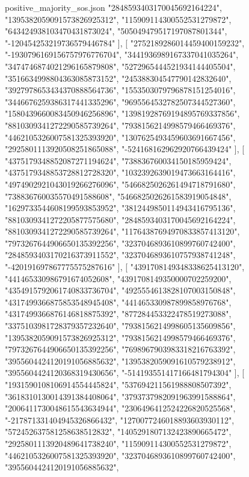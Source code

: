 \begin{filecontents*}[overwrite]{positive_majority_sos.json}
    "2848593403170045692164224",
    "1395382059091573826925312",
    "115909114300552531279872",
    "643424938103470431873024",
    "505049479517197087801344",
    "-120454253219736579446784"
   ],
   [
    "2752189286014459400159232",
    "-1930796169156757976776704",
    "3441936989167337041035264",
    "3474746874021296165879808",
    "5272965444521934144405504",
    "3516634998804363085873152",
    "245388304547790142832640",
    "3927978653434370888564736",
    "1553503079796878151254016",
    "3446676259386317441335296",
    "9695564532782507344527360",
    "1580439660083450946256896",
    "13981928769194895769337856",
    "8810309341272290585739264",
    "7938156214998579466469376",
    "4462105326007581325393920",
    "1307625493459603691667456",
    "2925801113920508251865088",
    "-524168162962920766439424"
   ],
   [
    "4375179348852087271194624",
    "738836760034150185959424",
    "4375179348853728812728320",
    "1032392639019473663164416",
    "4974902921043019266276096",
    "5466825026261494718791680",
    "738836760035570491588608",
    "5466825026261583919054848",
    "1629733544608199593853952",
    "3812449850114943416795136",
    "8810309341272205877575680",
    "2848593403170045692164224",
    "8810309341272290585739264",
    "11764387694970833857413120",
    "7973267644906650135392256",
    "3237046893610899760742400",
    "2848593403170216373911552",
    "3237046893610757938741248",
    "-420191697867775575287616"
   ],
   [
    "4391708149348338625413120",
    "441465330986791674052608",
    "4391708149350000702259200",
    "4354915792061740833736704",
    "4925554613828107003150848",
    "4317499366875853548945408",
    "441465330987899858976768",
    "4317499366876146818875392",
    "877284453322478519273088",
    "3375103981728379357232640",
    "7938156214998605135609856",
    "1395382059091573826925312",
    "7938156214998579466469376",
    "7973267644906650135392256",
    "7698967903983318216763392",
    "3955604424120191056885632",
    "1395382059091610579238912",
    "3955604424120368319430656",
    "-514193551417166481794304"
   ],
   [
    "1931590108106914554445824",
    "537694211561988808507392",
    "3618310130014391384408064",
    "3793737982091963991588864",
    "2006411730048615543634944",
    "2306496412524226820525568",
    "-217871331404945326866432",
    "1270077246018893603930112",
    "572452637581258638512832",
    "1405291807132423890665472",
    "2925801113920489641738240",
    "115909114300552531279872",
    "4462105326007581325393920",
    "3237046893610899760742400",
    "3955604424120191056885632",

\end{filecontents*}
